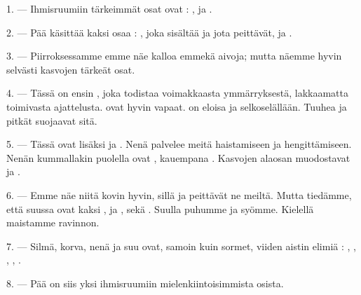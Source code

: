 
\VUsaut{4.0mm}
\VUsaut{2.0mm}

\VUsaut{2.4mm}
\VUsaut{3.0mm}

\VUsaut{3.0mm}

1. --- Ihmisruumiin tärkeimmät osat ovat : ,  ja
.

2. --- Pää käsittää kaksi osaa : , joka sisältää 
ja jota  peittävät, ja .

3. --- Piirroksessamme emme näe kalloa emmekä aivoja; mutta näemme hyvin
selvästi kasvojen tärkeät osat.

4. --- Tässä on ensin , joka todistaa voimakkaasta ymmärryksestä,
lakkaamatta toimivasta ajattelusta.  ovat hyvin vapaat.
 on eloisa ja selkoselällään. Tuuhea  ja pitkät
 suojaavat sitä.

5. --- Tässä ovat lisäksi  ja . Nenä palvelee
meitä haistamiseen ja hengittämiseen. Nenän kummallakin puolella ovat
, kauempana . Kasvojen alaosan muodostavat
 ja .

6. --- Emme näe niitä kovin hyvin, sillä  ja
 peittävät ne meiltä. Mutta tiedämme, että suussa ovat kaksi
,  ja  ,
sekä . Suulla puhumme ja syömme. Kielellä maistamme ravinnon.

7. --- Silmä, korva, nenä ja suu ovat, samoin kuin sormet, viiden aistin
elimiä : , , , ,
.

8. --- Pää on siis yksi ihmisruumiin mielenkiintoisimmista osista.

